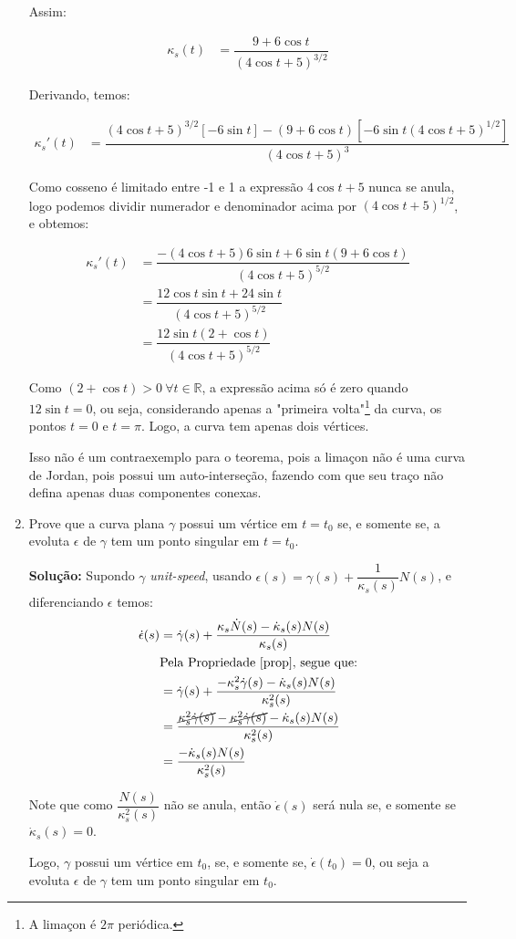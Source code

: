\documentclass[12pt,letterpaper]{article}
\newcommand{\real}{\mathbb{R}}
\begin{document}
\begin{enumerate}[3.3.1]
  Assim:
  
  \begin{align*}
  	\kappa_s(t)&=\dfrac{9+6\cos t}{(4\cos t+5)^{3/2}}
  	\end{align*}
  
  Derivando, temos:
  
  \begin{align*}
  	\kappa_s'(t)&=\dfrac{(4\cos t+5)^{3/2}[-6\sin t]-(9+6\cos t)[-6\sin t(4\cos t+5)^{1/2}]}{(4\cos t+5)^3}
  \end{align*}

	Como cosseno é limitado entre -1 e 1 a expressão $4\cos t+5$ nunca se anula, logo podemos dividir numerador e denominador acima por $(4\cos t+5)^{1/2}$, e obtemos:
	
	\begin{align*}
		\kappa_s'(t)&=\dfrac{-(4\cos t+5)6\sin t+6\sin t(9+6\cos t)}{(4\cos t+5)^{5/2}}\\
		&=\dfrac{12\cos t\sin t+24\sin t}{(4\cos t+5)^{5/2}}\\
		&=\dfrac{12\sin t(2+\cos t)}{(4\cos t+5)^{5/2}}
	\end{align*}

	Como $(2+\cos t)>0~\forall t \in \real$, a expressão acima só é zero quando $12\sin t=0$, ou seja, considerando apenas a "primeira volta"\footnote{A limaçon é $2\pi$ periódica.} da curva, os pontos $t=0$ e $t=\pi$. Logo, a curva tem apenas dois vértices.
	
	Isso não é um contraexemplo para o teorema, pois a limaçon não é uma curva de Jordan, pois possui um auto-interseção, fazendo com que seu traço não defina apenas duas componentes conexas.
		 
		 \item Prove que a curva plana $\gamma$ possui um vértice em $t=t_0$ se, e somente se, a evoluta $\epsilon$ de $\gamma$ tem um ponto singular em $t=t_0$.
		 
		 \textbf{Solução:} Supondo $\gamma$ \textit{unit-speed}, usando $\epsilon(s)=\gamma(s)+\dfrac{1}{\kappa_s(s)}N(s)$, e diferenciando $\epsilon$ temos:
		 \begin{align*}
		 	\dot{\epsilon}(s)&=\dot \gamma (s)+\dfrac{\kappa_s\dot N(s)-\dot\kappa_s(s)N(s)}{\kappa_s(s)}\\
		 	&\text{Pela Propriedade \ref{prop}, segue que:}\\
		 	&=\dot\gamma(s)+\dfrac{-\kappa_s^2\dot\gamma(s)-\dot\kappa_s(s)N(s)}{\kappa_s^2(s)}\\
		 	&=\dfrac{\cancel{\kappa_s^2\dot\gamma(s)}-\cancel{\kappa_s^2\dot\gamma(s)}-\dot\kappa_s(s)N(s)}{\kappa_s^2(s)}\\
		 	&=\dfrac{-\dot\kappa_s(s)N(s)}{\kappa_s^2(s)}
		 \end{align*}

	Note que como $\dfrac{N(s)}{\kappa_s^2(s)}$ não se anula, então $\dot\epsilon(s)$ será nula se, e somente se $\dot\kappa_s(s)=0$.
	
	Logo, $\gamma$ possui um vértice em $t_0$, se, e somente se, $\dot\epsilon(t_0)=0$, ou seja a evoluta $\epsilon$ de $\gamma$ tem um ponto singular em $t_0$.
		 
	\end{enumerate}
	
\end{document}
